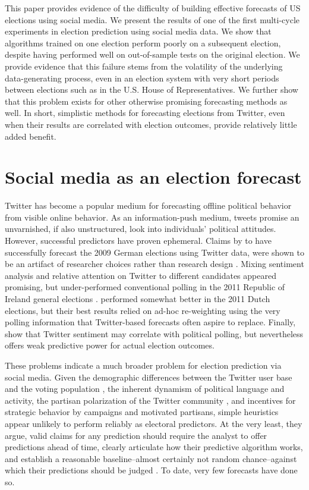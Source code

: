 \documentclass{sig-alternate-2013}
\begin{document}
This paper provides evidence of the difficulty of building effective
forecasts of US elections using social media. We present the results
of one of the first multi-cycle experiments in election prediction
using social media data. We show that algorithms trained on one
election perform poorly on a subsequent election, despite having
performed well on out-of-sample tests on the original election. We
provide evidence that this failure stems from the volatility of the
underlying data-generating process, even in an election system with
very short periods between elections such as in the U.S. House of
Representatives. We further show that this problem exists for other
otherwise promising forecasting methods as well. In short, simplistic
methods for forecasting elections from Twitter, even when their
results are correlated with election outcomes, provide relatively
little added benefit. 

\section{Social media as an election forecast}
\label{sec:social-media-as}

Twitter has become a popular medium for forecasting offline political
behavior from visible online behavior. As an information-push medium,
tweets promise an unvarnished, if also unstructured, look into
individuals' political attitudes. However, successful predictors have
proven ephemeral. Claims by \cite{tumasjan2010election} to have
successfully forecast the 2009 German elections using Twitter data,
were shown to be an artifact of researcher choices rather than
research design \cite{jungherr2012pirate}. Mixing sentiment analysis
and relative attention on Twitter to different candidates appeared
promising, but under-performed conventional polling in the 2011
Republic of Ireland general elections
\cite{bermingham2011using}. \cite{sang2012predicting} performed
somewhat better in the 2011 Dutch elections, but their best results
relied on ad-hoc re-weighting using the very polling information that
Twitter-based forecasts often aspire to replace. Finally,
\cite{o2010tweets} show that Twitter sentiment may correlate with
political polling, but nevertheless offers weak predictive power for
actual election outcomes.

These problems indicate a much broader problem for election prediction
via social media. Given the demographic
differences between the Twitter user base and the voting population
\cite{mislove2011understanding}, the inherent dynamism of political
language and activity, the partisan polarization of the Twitter
community \cite{conover2011}, and incentives for strategic behavior by
campaigns and motivated partisans, simple heuristics appear unlikely
to perform reliably as electoral predictors. At the very least, they
argue, valid claims for any prediction should require the analyst to
offer predictions ahead of time, clearly articulate how their
predictive algorithm works, and establish a reasonable
baseline--almost certainly not random chance--against which their
predictions should be judged \cite{metaxas2011not}. To date, very few
forecasts have done so.
\end{document}
